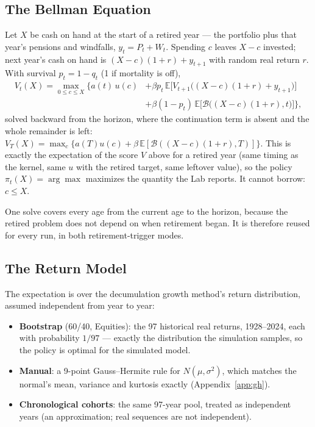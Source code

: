 \documentclass[11pt,letterpaper]{article}
\begin{document}
\subsection{The Bellman Equation}
Let $X$ be cash on hand at the start of a retired year --- the portfolio plus that year's pensions and windfalls, $y_t = P_t + W_t$. Spending $c$ leaves $X-c$ invested; next year's cash on hand is $(X-c)(1+r) + y_{t+1}$ with random real return $r$. With survival $p_t = 1-q_t$ (1 if mortality is off),
\begin{equation}
\begin{aligned}
V_t(X) = \max_{0 \le c \le X} \Big\{ a(t)\,u(c) &+ \beta p_t\, \mathbb{E}\big[V_{t+1}\big((X-c)(1+r) + y_{t+1}\big)\big] \\
&+ \beta(1-p_t)\,\mathbb{E}\big[\mathcal{B}\big((X-c)(1+r), t\big)\big] \Big\},
\end{aligned}
\end{equation}
solved backward from the horizon, where the continuation term is absent and the whole remainder is left: $V_T(X) = \max_c \{ a(T)u(c) + \beta\,\mathbb{E}[\mathcal{B}((X-c)(1+r),T)]\}$. This is exactly the expectation of the score $V$ above for a retired year (same timing as the kernel, same $u$ with the retired target, same leftover value), so the policy $\pi_t(X) = \arg\max$ maximizes the quantity the Lab reports. It cannot borrow: $c \le X$.

One solve covers every age from the current age to the horizon, because the retired problem does not depend on when retirement began. It is therefore reused for every run, in both retirement-trigger modes.

\subsection{The Return Model}
The expectation is over the decumulation growth method's return distribution, assumed independent from year to year:
\begin{itemize}
\setlength\itemsep{1pt}
\item \textbf{Bootstrap} (60/40, Equities): the 97 historical real returns, 1928--2024, each with probability $1/97$ --- exactly the distribution the simulation samples, so the policy is optimal for the simulated model.
\item \textbf{Manual}: a 9-point Gauss--Hermite rule for $N(\mu,\sigma^2)$, which matches the normal's mean, variance and kurtosis exactly (Appendix~\ref{app:gh}).
\item \textbf{Chronological cohorts}: the same 97-year pool, treated as independent years (an approximation; real sequences are not independent).
\end{itemize}
\end{document}
